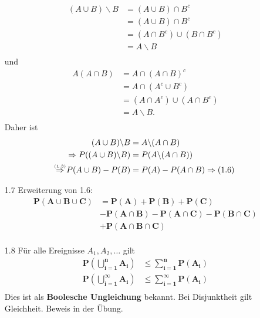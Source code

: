 \documentclass[a4paper,11pt]{article}
\newcommand\Raonethree{\overset{\mathclap{\scriptscriptstyle (1.3)}}{\Rightarrow}}
\begin{document}
\begin{itemize}
\begin{align*}
        (A\cup B) \backslash B &= (A \cup B) \cap B^c\\
        &= (A \cup B) \cap B^c\\
        &= (A \cap B^c) \cup (B \cap B^c)\\
        &= A \backslash B\\
        \end{align*} 
        und 
        \begin{align*}
        A (A\cap B) &= A \cap (A \cap B)^c\\
        &= A \cap (A^c \cup B^c)\\
        &= (A \cap A^c) \cup ( A \cap B^c)\\
        &= A \backslash B.\\
        \end{align*}
        Daher ist 
        \begin{align*}
        (A \cup B) \backslash B &= A \backslash (A\cap B)\\
        \Rightarrow P((A\cup B) \backslash B) &= P(A \backslash (A \cap B))\\
        \Raonethree P(A \cup B) - P(B) &= P(A) - P(A\cap B) \Rightarrow (1.6)\\
        \end{align*}
    \item[1.7] Erweiterung von 1.6: 
        \begin{align*}
        \mathbf{P(A\cup B\cup C)} &\mathbf{= P(A) + P(B) + P(C)}\\
        &\mathbf{- P(A\cap B) -P(A\cap C) -P(B\cap C)}\\ 
        &\mathbf{+ P(A\cap B\cap C)}\\
        \end{align*}
    \item[1.8] Für alle Ereignisse $A_1,A_2,\dots$ gilt
        \begin{align*}
        \mathbf{P(\bigcup_{i=1}^{n}A_i)} &\mathbf{\leq \sum_{i=1}^{n}P(A_i)}\\
        \mathbf{P(\bigcup_{i=1}^{\infty}A_i)} &\mathbf{\leq \sum_{i=1}^{\infty}P(A_i)}\\
        \end{align*}
        \newline Dies ist als \textbf{Boolesche Ungleichung} bekannt. Bei Disjunktheit gilt Gleichheit. Beweis in der Übung.
\end{itemize}
\end{document}
